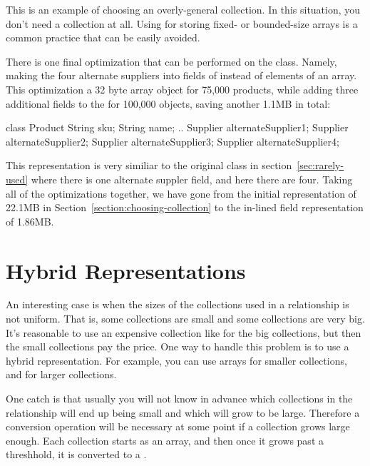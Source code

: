 This is an example of choosing an overly-general collection. In
this situation, you don't need a collection at all. Using 
for storing fixed- or bounded-size arrays is a
common practice that can be easily avoided.

There is one final optimization that can be performed on the 
class. Namely, making the four alternate suppliers into fields of
 instead of elements of an array. This optimization
 a 32 byte array object for 75,000 products, while adding three additional
 fields to the  for 100,000 objects, saving another 1.1MB in
 total:
\begin{shortlisting}
class Product {
	String sku;
	String name;
	.. 
	Supplier alternateSupplier1;
	Supplier alternateSupplier2;
	Supplier alternateSupplier3;
	Supplier alternateSupplier4;
}
\end{shortlisting}

This representation is very similiar to the original  class in
section~\ref{sec:rarely-used} where there is one alternate suppler field, and
here there are four. Taking all of the optimizations 
together, we have gone from the initial  representation
of 22.1MB in Section~\ref{section:choosing-collection} to the in-lined field
representation of 1.86MB. 

\section{Hybrid Representations}

An interesting case is when the sizes of the collections used in a relationship
is not uniform. That is, some collections are small and some collections are
very big.  It's reasonable to use an expensive collection like 
for the big collections, but then the small collections pay the price. One way
to handle this problem is to use a hybrid representation. For example, you can
use arrays for smaller collections, and  for larger
collections. 

One catch is that usually you will not know in advance which collections in the
relationship will end up being small and which will grow to be large. Therefore
a conversion operation will be necessary at some point if a collection grows
large enough. Each collection starts as an array, and then once it
grows past a threshhold, it is converted to a .

